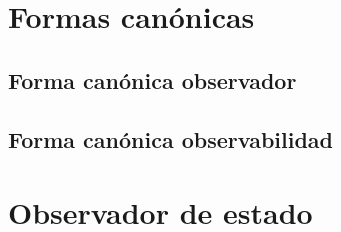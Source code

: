     \newpage
    \section{Formas canónicas}
        \subsection{Forma canónica observador}
        \subsection{Forma canónica observabilidad}

    \newpage
    \section{Observador de estado}
